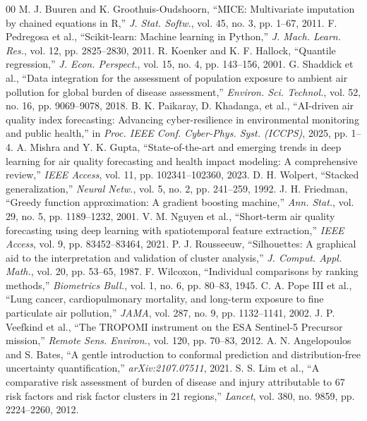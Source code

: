 \documentclass[conference]{IEEEtran}
\begin{document}
\begin{thebibliography}{00}
 M. J. Buuren and K. Groothuis-Oudshoorn, ``MICE: Multivariate imputation by chained equations in R,'' \textit{J. Stat. Softw.}, vol. 45, no. 3, pp. 1--67, 2011.
 F. Pedregosa et al., ``Scikit-learn: Machine learning in Python,'' \textit{J. Mach. Learn. Res.}, vol. 12, pp. 2825--2830, 2011.
 R. Koenker and K. F. Hallock, ``Quantile regression,'' \textit{J. Econ. Perspect.}, vol. 15, no. 4, pp. 143--156, 2001.
 G. Shaddick et al., ``Data integration for the assessment of population exposure to ambient air pollution for global burden of disease assessment,'' \textit{Environ. Sci. Technol.}, vol. 52, no. 16, pp. 9069--9078, 2018.
 B. K. Paikaray, D. Khadanga, et al., ``AI-driven air quality index forecasting: Advancing cyber-resilience in environmental monitoring and public health,'' in \textit{Proc. IEEE Conf. Cyber-Phys. Syst. (ICCPS)}, 2025, pp. 1--4.
 A. Mishra and Y. K. Gupta, ``State-of-the-art and emerging trends in deep learning for air quality forecasting and health impact modeling: A comprehensive review,'' \textit{IEEE Access}, vol. 11, pp. 102341--102360, 2023.
 D. H. Wolpert, ``Stacked generalization,'' \textit{Neural Netw.}, vol. 5, no. 2, pp. 241--259, 1992.
 J. H. Friedman, ``Greedy function approximation: A gradient boosting machine,'' \textit{Ann. Stat.}, vol. 29, no. 5, pp. 1189--1232, 2001.
 V. M. Nguyen et al., ``Short-term air quality forecasting using deep learning with spatiotemporal feature extraction,'' \textit{IEEE Access}, vol. 9, pp. 83452--83464, 2021.
 P. J. Rousseeuw, ``Silhouettes: A graphical aid to the interpretation and validation of cluster analysis,'' \textit{J. Comput. Appl. Math.}, vol. 20, pp. 53--65, 1987.
 F. Wilcoxon, ``Individual comparisons by ranking methods,'' \textit{Biometrics Bull.}, vol. 1, no. 6, pp. 80--83, 1945.
 C. A. Pope III et al., ``Lung cancer, cardiopulmonary mortality, and long-term exposure to fine particulate air pollution,'' \textit{JAMA}, vol. 287, no. 9, pp. 1132--1141, 2002.
 J. P. Veefkind et al., ``The TROPOMI instrument on the ESA Sentinel-5 Precursor mission,'' \textit{Remote Sens. Environ.}, vol. 120, pp. 70--83, 2012.
 A. N. Angelopoulos and S. Bates, ``A gentle introduction to conformal prediction and distribution-free uncertainty quantification,'' \textit{arXiv:2107.07511}, 2021.
 S. S. Lim et al., ``A comparative risk assessment of burden of disease and injury attributable to 67 risk factors and risk factor clusters in 21 regions,'' \textit{Lancet}, vol. 380, no. 9859, pp. 2224--2260, 2012.
\end{thebibliography}
\end{document}
